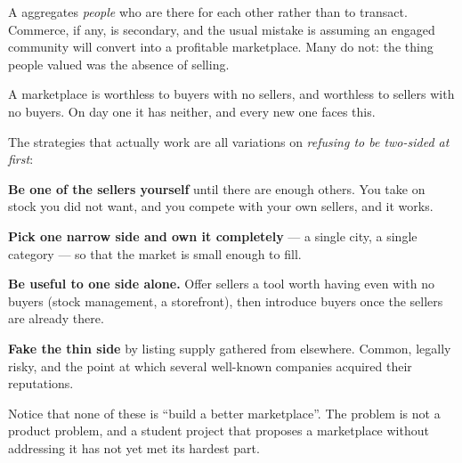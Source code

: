 A  aggregates \emph{people} who are there for each other rather
than to transact. Commerce, if any, is secondary, and the usual mistake is
assuming an engaged community will convert into a profitable marketplace. Many
do not: the thing people valued was the absence of selling.

\begin{conceptbox}
A marketplace is worthless to buyers with no sellers, and worthless to sellers
with no buyers. On day one it has neither, and every new one faces this.

\smallskip
The strategies that actually work are all variations on \emph{refusing to be
two-sided at first}:

\begin{tight}
  \item \textbf{Be one of the sellers yourself} until there are enough others.
        You take on stock you did not want, and you compete with your own
        sellers, and it works.
  \item \textbf{Pick one narrow side and own it completely} --- a single city, a
        single category --- so that the market is small enough to fill.
  \item \textbf{Be useful to one side alone.} Offer sellers a tool worth having
        even with no buyers (stock management, a storefront), then introduce
        buyers once the sellers are already there.
  \item \textbf{Fake the thin side} by listing supply gathered from elsewhere.
        Common, legally risky, and the point at which several well-known
        companies acquired their reputations.
\end{tight}

\smallskip
Notice that none of these is ``build a better marketplace''. The problem is not
a product problem, and a student project that proposes a marketplace without
addressing it has not yet met its hardest part.
\end{conceptbox}

